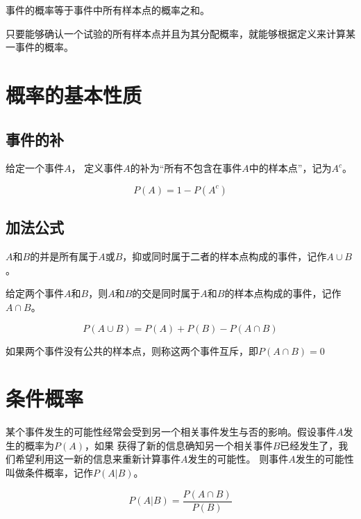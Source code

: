 \documentclass[a4paper]{ctexrep}
\begin{document}
\begin{tcolorbox}[title = {事件的概率}]
事件的概率等于事件中所有样本点的概率之和。
\end{tcolorbox}

只要能够确认一个试验的所有样本点并且为其分配概率，就能够根据定义来计算某一事件的概率。

\section{概率的基本性质}
\subsection{事件的补}
给定一个事件$A$， 定义事件$A$的补为“所有不包含在事件$A$中的样本点”，记为$A^{c}$。
\begin{tcolorbox}[title = {利用事件的补计算概率}]
\[P(A)=1-P(A^{c})\]
\end{tcolorbox}

\subsection{加法公式}
\begin{tcolorbox}[title = {两个事件的并}]
$A$和$B$的并是所有属于$A$或$B$，抑或同时属于二者的样本点构成的事件，记作$A\cup B$。
\end{tcolorbox}

\begin{tcolorbox}[title = {两个事件的交}]
给定两个事件$A$和$B$，则$A$和$B$的交是同时属于$A$和$B$的样本点构成的事件，记作$A\cap B$。
\end{tcolorbox}

\begin{tcolorbox}[title = {加法公式}]
\[P(A\cup B)=P(A)+P(B)-P(A\cap B)\]
\end{tcolorbox}

\begin{tcolorbox}[title = {互斥事件}]
如果两个事件没有公共的样本点，则称这两个事件互斥，即$P(A\cap B) = 0$
\end{tcolorbox}

\section{条件概率}
某个事件发生的可能性经常会受到另一个相关事件发生与否的影响。假设事件$A$发生的概率为$P(A)$，如果
获得了新的信息确知另一个相关事件$B$已经发生了，我们希望利用这一新的信息来重新计算事件$A$发生的可能性。
则事件$A$发生的可能性叫做条件概率，记作$P(A|B)$。
\begin{tcolorbox}[title = {条件概率}]
\[P(A|B)=\frac{P(A\cap B)}{P(B)}\]
\end{tcolorbox}
\end{document}
